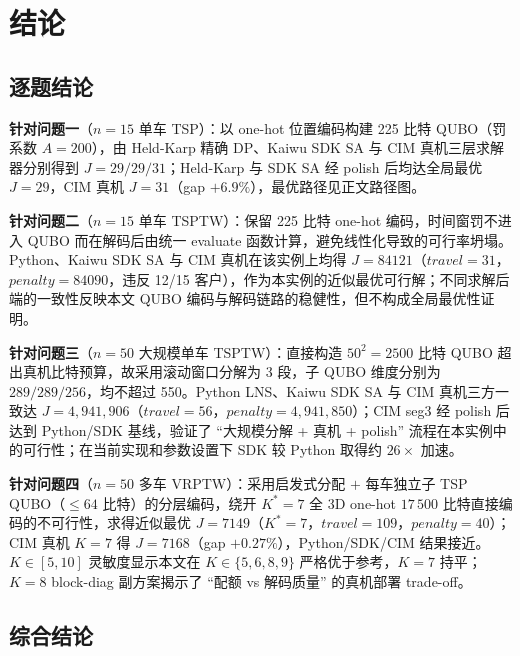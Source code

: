 \documentclass[UTF8,12pt,a4paper]{ctexart}
\begin{document}
\section{结论}

\subsection{逐题结论}

\textbf{针对问题一}（$n\!=\!15$ 单车 TSP）：以 one-hot 位置编码构建 225 比特 QUBO（罚系数 $A\!=\!200$），由 Held-Karp 精确 DP、Kaiwu SDK SA 与 CIM 真机三层求解器分别得到 $J\!=\!29/29/31$；Held-Karp 与 SDK SA 经 polish 后均达全局最优 $J\!=\!29$，CIM 真机 $J\!=\!31$（gap $+6.9\%$），最优路径见正文路径图。

\textbf{针对问题二}（$n\!=\!15$ 单车 TSPTW）：保留 225 比特 one-hot 编码，时间窗罚不进入 QUBO 而在解码后由统一 evaluate 函数计算，避免线性化导致的可行率坍塌。Python、Kaiwu SDK SA 与 CIM 真机在该实例上均得 $J\!=\!84121$（$travel\!=\!31$，$penalty\!=\!84090$，违反 12/15 客户），作为本实例的近似最优可行解；不同求解后端的一致性反映本文 QUBO 编码与解码链路的稳健性，但不构成全局最优性证明。

\textbf{针对问题三}（$n\!=\!50$ 大规模单车 TSPTW）：直接构造 $50^2\!=\!2500$ 比特 QUBO 超出真机比特预算，故采用滚动窗口分解为 3 段，子 QUBO 维度分别为 $289/289/256$，均不超过 550。Python LNS、Kaiwu SDK SA 与 CIM 真机三方一致达 $J\!=\!4{,}941{,}906$（$travel\!=\!56$，$penalty\!=\!4{,}941{,}850$）；CIM seg3 经 polish 后达到 Python/SDK 基线，验证了 ``大规模分解 + 真机 + polish'' 流程在本实例中的可行性；在当前实现和参数设置下 SDK 较 Python 取得约 $26\times$ 加速。

\textbf{针对问题四}（$n\!=\!50$ 多车 VRPTW）：采用启发式分配 $+$ 每车独立子 TSP QUBO（$\le\!64$ 比特）的分层编码，绕开 $K^{*}\!=\!7$ 全 3D one-hot $17\,500$ 比特直接编码的不可行性，求得近似最优 $J\!=\!7149$（$K^{\ast}\!=\!7$，$travel\!=\!109$，$penalty\!=\!40$）；CIM 真机 $K\!=\!7$ 得 $J\!=\!7168$（gap $+0.27\%$），Python/SDK/CIM 结果接近。$K\!\in\![5,10]$ 灵敏度显示本文在 $K\!\in\!\{5,6,8,9\}$ 严格优于参考，$K\!=\!7$ 持平；$K\!=\!8$ block-diag 副方案揭示了 ``配额 vs 解码质量'' 的真机部署 trade-off。

\subsection{综合结论}
\end{document}
